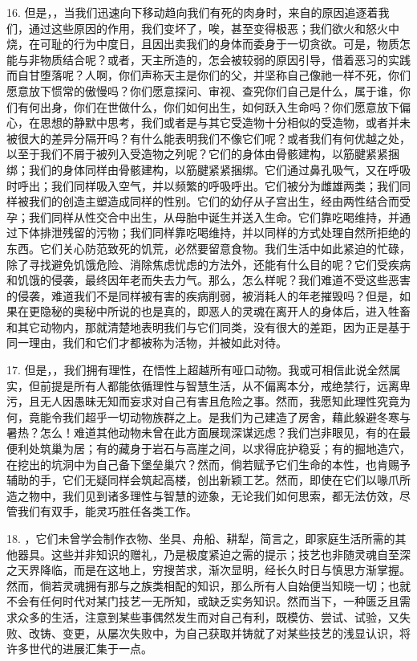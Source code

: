 16. 但是，，当我们迅速向下移动趋向我们有死的肉身时，来自的原因追逐着我们，通过这些原因的作用，我们变坏了，唉，甚至变得极恶；我们欲火和怒火中烧，在可耻的行为中度日，且因出卖我们的身体而委身于一切贪欲。可是，物质怎能与非物质结合呢？或者，天主所造的，怎会被较弱的原因引导，借着恶习的实践而自甘堕落呢？人啊，你们声称天主是你们的父，并坚称自己像祂一样不死，你们愿意放下惯常的傲慢吗？你们愿意探问、审视、查究你们自己是什么，属于谁，你们有何出身，你们在世做什么，你们如何出生，如何跃入生命吗？你们愿意放下偏心，在思想的静默中思考，我们或者是与其它受造物十分相似的受造物，或者并未被很大的差异分隔开吗？有什么能表明我们不像它们呢？或者我们有何优越之处，以至于我们不屑于被列入受造物之列呢？它们的身体由骨骸建构，以筋腱紧紧捆绑；我们的身体同样由骨骸建构，以筋腱紧紧捆绑。它们通过鼻孔吸气，又在呼吸时呼出；我们同样吸入空气，并以频繁的呼吸呼出。它们被分为雌雄两类；我们同样被我们的创造主塑造成同样的性别。它们的幼仔从子宫出生，经由两性结合而受孕；我们同样从性交合中出生，从母胎中诞生并送入生命。它们靠吃喝维持，并通过下体排泄残留的污物；我们同样靠吃喝维持，并以同样的方式处理自然所拒绝的东西。它们关心防范致死的饥荒，必然要留意食物。我们生活中如此紧迫的忙碌，除了寻找避免饥饿危险、消除焦虑忧虑的方法外，还能有什么目的呢？它们受疾病和饥饿的侵袭，最终因年老而失去力气。那么，怎么样呢？我们难道不受这些恶害的侵袭，难道我们不是同样被有害的疾病削弱，被消耗人的年老摧毁吗？但是，如果在更隐秘的奥秘中所说的也是真的，即恶人的灵魂在离开人的身体后，进入牲畜和其它动物内，那就清楚地表明我们与它们同类，没有很大的差距，因为正是基于同一理由，我们和它们才都被称为活物，并被如此对待。\par

17. 但是，，我们拥有理性，在悟性上超越所有哑口动物。我或可相信此说全然属实，但前提是所有人都能依循理性与智慧生活，从不偏离本分，戒绝禁行，远离卑污，且无人因愚昧无知而妄求对自己有害且危险之事。然而，我愿知此理性究竟为何，竟能令我们超乎一切动物族群之上。是我们为己建造了房舍，藉此躲避冬寒与暑热？怎么！难道其他动物未曾在此方面展现深谋远虑？我们岂非眼见，有的在最便利处筑巢为居；有的藏身于岩石与高崖之间，以求得庇护稳妥；有的掘地造穴，在挖出的坑洞中为自己备下堡垒巢穴？然而，倘若赋予它们生命的本性，也肯赐予辅助的手，它们无疑同样会筑起高楼，创出新颖工艺。然而，即使在它们以喙爪所造之物中，我们见到诸多理性与智慧的迹象，无论我们如何思索，都无法仿效，尽管我们有双手，能灵巧胜任各类工作。\par

18. ，它们未曾学会制作衣物、坐具、舟船、耕犁，简言之，即家庭生活所需的其他器具。这些并非知识的赠礼，乃是极度紧迫之需的提示；技艺也非随灵魂自至深之天界降临，而是在这地上，穷搜苦求，渐次显明，经长久时日与慎思方渐掌握。然而，倘若灵魂拥有那与之族类相配的知识，那么所有人自始便当知晓一切；也就不会有任何时代对某门技艺一无所知，或缺乏实务知识。然而当下，一种匮乏且需求众多的生活，注意到某些事偶然发生而对自己有利，既模仿、尝试、试验，又失败、改铸、变更，从屡次失败中，为自己获取并铸就了对某些技艺的浅显认识，将许多世代的进展汇集于一点。\par

